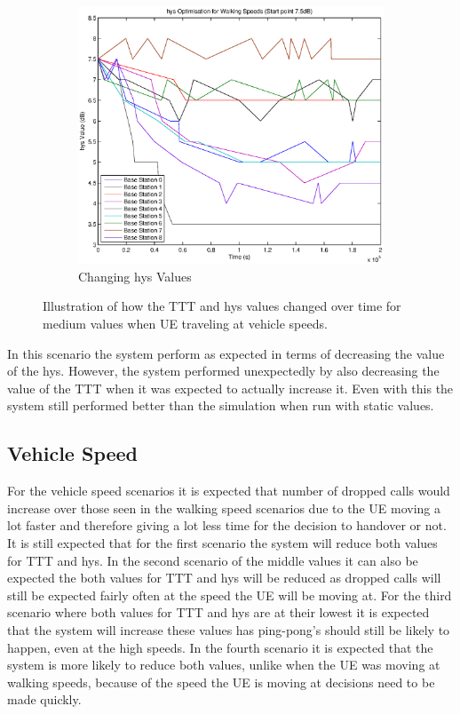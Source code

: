 \begin{figure}[H]
\begin{subfigure}[b]{0.49\textwidth}
                \includegraphics[width=\textwidth]{figures/walking_figures/highhys/long_hys.eps}
                \caption{Changing hys Values}
                \label{fig:walk_highhys_hys}
        \end{subfigure}
        \caption{Illustration of how the TTT and hys values changed over time for medium values when UE traveling at vehicle speeds.}\label{fig:walk_highhys_ttthys}
\end{figure}
In this scenario the system perform as expected in terms of decreasing the value of the hys. However, the system performed unexpectedly by also decreasing the value of the TTT when it was expected to actually increase it. Even with this the system still performed better than the simulation when run with static values.

\subsection{Vehicle Speed}
For the vehicle speed scenarios it is expected that number of dropped calls would increase over those seen in the walking speed scenarios due to the UE moving a lot faster and therefore giving a lot less time for the decision to handover or not. It is still expected that for the first scenario the system will reduce both values for TTT and hys. In the second scenario of the middle values it can also be expected the both values for TTT and hys will be reduced as dropped calls will still be expected fairly often at the speed the UE will be moving at. For the third scenario where both values for TTT and hys are at their lowest it is expected that the system will increase these values has ping-pong's should still be likely to happen, even at the high speeds. In the fourth scenario it is expected that the system is more likely to reduce both values, unlike when the UE was moving at walking speeds, because of the speed the UE is moving at decisions need to be made quickly.
